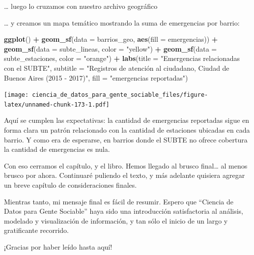 \documentclass[]{book}
\newenvironment{Shaded}{\begin{snugshade}}{\end{snugshade}}
\newcommand{\KeywordTok}[1]{\textcolor[rgb]{0.13,0.29,0.53}{\textbf{#1}}}
\newcommand{\DataTypeTok}[1]{\textcolor[rgb]{0.13,0.29,0.53}{#1}}
\newcommand{\StringTok}[1]{\textcolor[rgb]{0.31,0.60,0.02}{#1}}
\newcommand{\OperatorTok}[1]{\textcolor[rgb]{0.81,0.36,0.00}{\textbf{#1}}}
\newcommand{\NormalTok}[1]{#1}
\begin{document}
\ldots{} luego lo cruzamos con nuestro archivo geográfico

\begin{Shaded}
\end{Shaded}

\ldots{} y creamos un mapa temático mostrando la suma de emergencias por
barrio:

\begin{Shaded}
\begin{Highlighting}[]
\KeywordTok{ggplot}\NormalTok{() }\OperatorTok{+}
\StringTok{    }\KeywordTok{geom_sf}\NormalTok{(}\DataTypeTok{data =}\NormalTok{ barrios_geo, }\KeywordTok{aes}\NormalTok{(}\DataTypeTok{fill =}\NormalTok{ emergencias)) }\OperatorTok{+}
\StringTok{    }\KeywordTok{geom_sf}\NormalTok{(}\DataTypeTok{data =}\NormalTok{ subte_lineas, }\DataTypeTok{color =} \StringTok{"yellow"}\NormalTok{) }\OperatorTok{+}
\StringTok{    }\KeywordTok{geom_sf}\NormalTok{(}\DataTypeTok{data =}\NormalTok{ subte_estaciones, }\DataTypeTok{color =} \StringTok{"orange"}\NormalTok{) }\OperatorTok{+}
\StringTok{    }\KeywordTok{labs}\NormalTok{(}\DataTypeTok{title =} \StringTok{"Emergencias relacionadas con el SUBTE"}\NormalTok{,}
         \DataTypeTok{subtitle =} \StringTok{"Registros de atención al ciudadano, Ciudad de Buenos Aires (2015 - 2017)"}\NormalTok{,}
         \DataTypeTok{fill =} \StringTok{"emergencias reportadas"}\NormalTok{)}
\end{Highlighting}
\end{Shaded}

\texttt{[image: ciencia\_de\_datos\_para\_gente\_sociable\_files/figure-latex/unnamed-chunk-173-1.pdf]}

Aquí se cumplen las expectativas: la cantidad de emergencias reportadas
sigue en forma clara un patrón relacionado con la cantidad de estaciones
ubicadas en cada barrio. Y como era de esperarse, en barrios donde el
SUBTE no ofrece cobertura la cantidad de emergencias es nula.

Con eso cerramos el capítulo, y el libro. Hemos llegado al brusco
final\ldots{} al menos brusco por ahora. Continuaré puliendo el texto, y
más adelante quisiera agregar un breve capítulo de consideraciones
finales.

Mientras tanto, mi mensaje final es fácil de resumir. Espero que
``Ciencia de Datos para Gente Sociable'' haya sido una introducción
satisfactoria al análisis, modelado y visualización de información, y
tan sólo el inicio de un largo y gratificante recorrido.

¡Gracias por haber leído hasta aquí!


\end{document}
